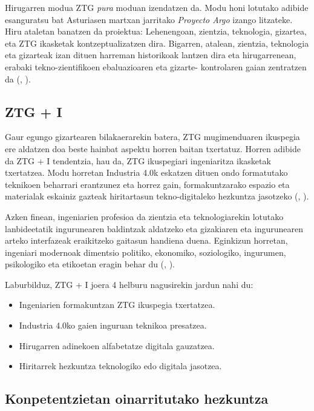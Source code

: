 Hirugarren modua ZTG \textit{pura} moduan izendatzen da. Modu honi lotutako adibide esanguratsu bat Asturiasen martxan jarritako \textit{Proyecto Argo} izango litzateke. Hiru ataletan banatzen da proiektua: Lehenengoan, zientzia, teknologia, gizartea, eta ZTG ikasketak kontzeptualizatzen dira. Bigarren, atalean, zientzia, teknologia eta gizarteak izan dituen harreman historikoak lantzen dira eta hirugarrenean, erabaki tekno-zientifikoen ebaluazioaren eta gizarte- kontrolaren gaian zentratzen da (\citeauthor{osorio2002educacion}, \citeyear{osorio2002educacion}).

\subsection{ZTG + I}\label{subsec:ztgi}

Gaur egungo gizartearen bilakaerarekin batera, ZTG mugimenduaren ikuspegia ere aldatzen doa beste hainbat aspektu horren baitan txertatuz. Horren adibide da ZTG + I tendentzia, hau da, ZTG ikuspegiari ingeniaritza ikasketak txertatzea. Modu horretan Industria 4.0k eskatzen dituen ondo formatutako teknikoen beharrari erantzunez eta horrez gain, formakuntzarako espazio eta materialak eskainiz gazteak hiritartasun tekno-digitaleko hezkuntza jasotzeko (\citeauthor{toscano2017}, \citeyear{toscano2017}).

Azken finean, ingeniarien profesioa da zientzia eta teknologiarekin lotutako lanbideetatik ingurunearen baldintzak aldatzeko eta gizakiaren eta ingurunearen arteko interfazeak eraikitzeko gaitasun handiena duena. Eginkizun horretan, ingeniari modernoak dimentsio politiko, ekonomiko, soziologiko, ingurumen, psikologiko eta etikoetan eragin behar du (\citeauthor{toscano2017}, \citeyear{toscano2017}).

Laburbilduz, ZTG + I joera 4 helburu nagusirekin jardun nahi du:
\begin{itemize}
    \item Ingeniarien formakuntzan ZTG ikuspegia txertatzea.
    \item Industria 4.0ko gaien inguruan teknikoa presatzea.
    \item Hirugarren adinekoen alfabetatze digitala gauzatzea.
    \item Hiritarrek hezkuntza teknologiko edo digitala jasotzea.
\end{itemize}

\subsection{Konpetentzietan oinarritutako hezkuntza}\label{subsec:konp}


